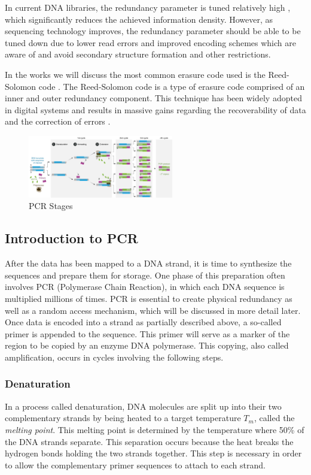 \documentclass[a4paper,conference]{IEEEtran}
\begin{document}
In current DNA libraries, the redundancy parameter is tuned relatively high \cite{pcrbased}, which significantly reduces the achieved information density. However, as sequencing technology improves, the redundancy parameter should be able to be tuned down \cite{pcrbased} due to lower read errors and improved encoding schemes which are aware of and avoid secondary structure formation and other restrictions.

In the works we will discuss the most common erasure code used is the Reed-Solomon code \cite{reedsolomoncode}. The Reed-Solomon code is a type of erasure code comprised of an inner and outer redundancy component. This technique has been widely adopted in digital systems and results in massive gains regarding the recoverability of data and the correction of errors \cite{}.



\begin{figure}[!t]
\centering
\includegraphics[width=2.5in]{pcr}
\caption{PCR Stages}
\label{fig_sim}
\end{figure}

\subsection{Introduction to PCR}

After the data has been mapped to a DNA strand, it is time to synthesize the sequences and prepare them for storage. One phase of this preparation often involves PCR (Polymerase Chain Reaction), in which each DNA sequence is multiplied millions of times. PCR is essential to create physical redundancy as well as a random access mechanism, which will be discussed in more detail later. Once data is encoded into a strand as partially described above, a so-called primer is appended to the sequence. This primer will serve as a marker of the region to be copied by an enzyme DNA polymerase. This copying, also called amplification, occurs in cycles involving the following steps. \\

\subsubsection{Denaturation}
In a process called denaturation, DNA molecules are split up into their two complementary strands by being heated to a target temperature $T_m$, called the \textit{melting point}. This melting point is determined by the temperature where 50\% of the DNA strands separate. This separation occurs because the heat breaks the hydrogen bonds holding the two strands together. This step is necessary in order to allow the complementary primer sequences to attach to each strand. \\
\end{document}
